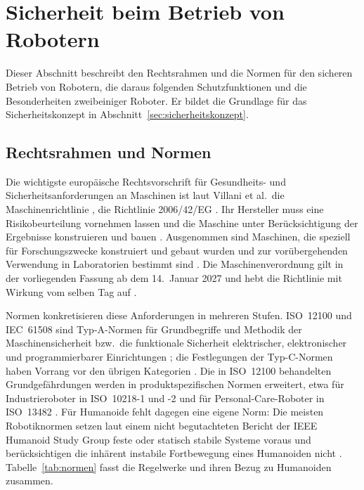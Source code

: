 \section{Sicherheit beim Betrieb von Robotern}
\label{sec:sicherheit_grundlagen}
Dieser Abschnitt beschreibt den Rechtsrahmen und die Normen für den sicheren Betrieb von Robotern, die daraus folgenden Schutzfunktionen und die Besonderheiten zweibeiniger Roboter.
Er bildet die Grundlage für das Sicherheitskonzept in Abschnitt~\ref{sec:sicherheitskonzept}.

\subsection{Rechtsrahmen und Normen}
\label{sec:normen}
Die wichtigste europäische Rechtsvorschrift für Gesundheits- und Sicherheitsanforderungen an Maschinen ist laut Villani et al.\ die Maschinenrichtlinie \cite{Villani2018}, die Richtlinie 2006/42/EG \cite{MRL2006}\ev{*}.
Ihr Hersteller muss eine Risikobeurteilung vornehmen lassen und die Maschine unter Berücksichtigung der Ergebnisse konstruieren und bauen \cite{MRL2006}.
Ausgenommen sind Maschinen, die speziell für Forschungszwecke konstruiert und gebaut wurden und zur vorübergehenden Verwendung in Laboratorien bestimmt sind \cite{MRL2006}.
Die Maschinenverordnung gilt in der vorliegenden Fassung ab dem 14.~Januar 2027 und hebt die Richtlinie mit Wirkung vom selben Tag auf \cite{MVO2023}.

Normen konkretisieren diese Anforderungen in mehreren Stufen.
ISO~12100 und IEC~61508 sind Typ-A-Normen für Grundbegriffe und Methodik der Maschinensicherheit bzw.\ die funktionale Sicherheit elektrischer, elektronischer und programmierbarer Einrichtungen \cite{Villani2018}; die Festlegungen der Typ-C-Normen haben Vorrang vor den übrigen Kategorien \cite{Villani2018}.
Die in ISO~12100 behandelten Grundgefährdungen werden in produktspezifischen Normen erweitert, etwa für Industrieroboter in ISO~10218-1 und -2 und für Personal-Care-Roboter in ISO~13482 \cite{Prather2025}.
Für Humanoide fehlt dagegen eine eigene Norm: Die meisten Robotiknormen setzen laut einem nicht begutachteten Bericht der IEEE Humanoid Study Group feste oder statisch stabile Systeme voraus und berücksichtigen die inhärent instabile Fortbewegung eines Humanoiden nicht \cite{Prather2025}.
Tabelle~\ref{tab:normen} fasst die Regelwerke und ihren Bezug zu Humanoiden zusammen.

